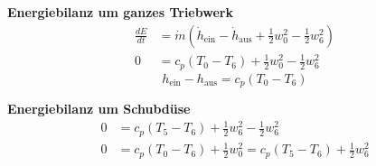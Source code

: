 

\item[b)] \textbf{Energiebilanz um ganzes Triebwerk}
        \begin{align*}
            \frac{d\dot{E}}{dt} &= \dot{m} (\dot{h}_{\text{ein}} - \dot{h}_{\text{aus}} + \frac{1}{2} w_{0}^2 - \frac{1}{2} w_{6}^2) \\
            0 &= c_p (T_0 - T_6) + \frac{1}{2} w_{0}^2 - \frac{1}{2} w_{6}^2
        \end{align*}
        \begin{equation*}
            h_{\text{ein}} - h_{\text{aus}} = c_p (T_0 - T_6)
        \end{equation*}
        
        \textbf{Energiebilanz um Schubdüse}
        \begin{align*}
            0 &= c_p (T_5 - T_6) + \frac{1}{2} w_{6}^2 - \frac{1}{2} w_{6}^2 \\
            0 &= c_p (T_0 - T_6) + \frac{1}{2} w_{0}^2 = c_p (T_5 - T_6) + \frac{1}{2} w_{6}^2
        \end{align*}